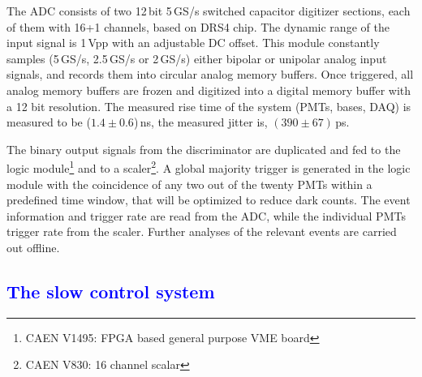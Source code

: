 The ADC consists of two 12\,bit 5\,GS/s switched capacitor digitizer sections, 
each of them with 16+1 channels, based on DRS4 chip. The dynamic range of the input signal is 1\,Vpp with an adjustable DC offset. This module constantly samples (5\,GS/s, 2.5\,GS/s or 2\,GS/s) either bipolar or unipolar analog input 
signals, and records them into circular 
analog memory buffers. Once triggered, all analog memory 
buffers are frozen and digitized into a digital memory buffer 
with a 12 bit resolution. The measured rise time of the system (PMTs, bases, DAQ) is measured to be ($1.4 \pm 0.6$)\,ns, the measured jitter is, $(390 \pm 67)$\,ps. 

The binary output signals from the discriminator are duplicated and fed to 
the logic module\footnote{CAEN V1495: FPGA based general purpose VME board} and to a scaler\footnote{CAEN V830: 16 channel scalar}. 
A global majority trigger is generated in the logic module with the coincidence of any two out of the twenty PMTs within a predefined time window, that will be optimized to reduce dark counts. The event information and trigger rate are read from the ADC, while the individual PMTs trigger rate from the scaler. Further analyses of the relevant events are carried out offline.

\subsection{\textcolor{blue}{The slow control system}}
\label{subsec:sc}
